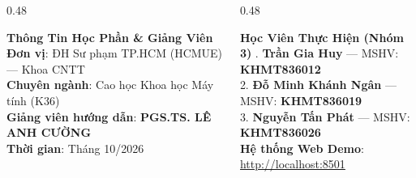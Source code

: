 \documentclass[aspectratio=169, 10pt]{beamer}
\begin{document}
{\begin{frame}[plain]
  \vspace{0.15cm}
  \begin{columns}[T, onlytextwidth]
    \begin{column}{0.48\textwidth}
      \begin{block}{\small\textbf{Thông Tin Học Phần \& Giảng Viên}}
        \fontsize{8}{10.5}\selectfont
        \textbf{Đơn vị}: ĐH Sư phạm TP.HCM (HCMUE) — Khoa CNTT\\
        \textbf{Chuyên ngành}: Cao học Khoa học Máy tính (K36)\\
        \textbf{Giảng viên hướng dẫn}: \textbf{\color{HCMUEDarkBlue}PGS.TS. LÊ ANH CƯỜNG}\\
        \textbf{Thời gian}: Tháng 10/2026
      \end{block}
    \end{column}
    \hfill
    \begin{column}{0.48\textwidth}
      \begin{block}{\small\textbf{Học Viên Thực Hiện (Nhóm 3)}}
        \fontsize{8}{10.5}. \textbf{Trần Gia Huy} — MSHV: \textbf{KHMT836012}\\
        2. \textbf{Đỗ Minh Khánh Ngân} — MSHV: \textbf{KHMT836019}\\
        3. \textbf{Nguyễn Tấn Phát} — MSHV: \textbf{KHMT836026}\\
        \textbf{Hệ thống Web Demo}: \url{http://localhost:8501}
      \end{block}
    \end{column}
  \end{columns}
\end{frame}
}
\end{document}
